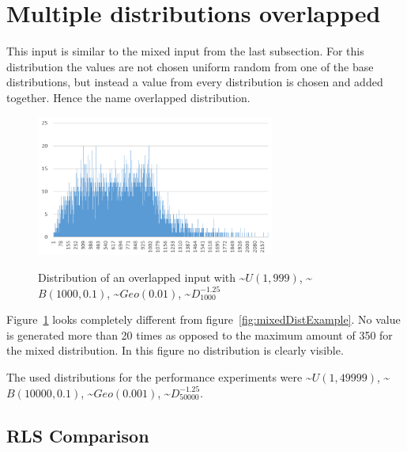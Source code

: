\section{Multiple distributions overlapped}
This input is similar to the mixed input from the last subsection.
For this distribution the values are not chosen uniform random from one of the base distributions, but instead a value from every distribution is chosen and added together.
Hence the name overlapped distribution.

\begin{figure}[h]
      \caption{Distribution of an overlapped input with \textasciitilde$U(1,999)$, \textasciitilde$B(1000,0.1)$, \textasciitilde$Geo(0.01)$, \textasciitilde$D^{-1.25}_{1000}$}
      \centering
      \includegraphics[width=0.7\textwidth]{figures/images/numberGenerator/overlapped.png}\label{fig:overlappedDistExample}
\end{figure}

Figure~\ref{fig:overlappedDistExample} looks completely different from figure~\ref{fig:mixedDistExample}.
No value is generated more than 20 times as opposed to the maximum amount of 350 for the mixed distribution.
In this figure no distribution is clearly visible.

The used distributions for the performance experiments were \textasciitilde$U(1,49999)$, \textasciitilde$B(10000,0.1)$, \textasciitilde$Geo(0.001)$, \textasciitilde$D^{-1.25}_{50000}$.
\subsection{RLS Comparison}




